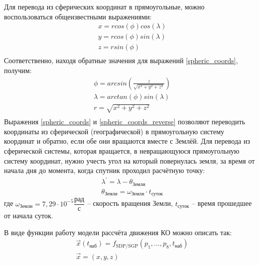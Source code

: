 Для перевода из сферических координат в прямоугольные, можно воспользоваться общеизвестными выражениями:
\begin{equation}  \label{spheric_coords}
	\begin{aligned} 
		& x = r cos(\phi)cos(\lambda) \\ 
		& y = r cos(\phi)sin(\lambda) \\ 
		& z = r sin(\phi) \\ 
	\end{aligned} 
\end{equation} 
Соответственно, находя обратные значения для выражений \ref{spheric_coords}, получим:
\begin{equation} \label{spheric_coords_reverse}
	\begin{aligned}
		& \phi = arcsin(\frac{z}{\sqrt{x^2+y^2+z^2}}) \\ 
		& \lambda = arctan(\phi)sin(\lambda) \\ 
		& r = \sqrt{x^2+y^2+z^2} \\ 
	\end{aligned} 
\end{equation} 
Выражения \ref{spheric_coords} и \ref{spheric_coords_reverse} позволяют переводить координаты из сферической
(географической) в прямоугольную систему координат и обратно, если обе они вращаются вместе с Землёй. Для перевода
из сферической системы, которая вращается, в невращающуюся прямоугольную систему координат, нужно учесть угол на
который повернулась земля, за время от начала дня до момента, когда спутник проходил расчётную точку:
\begin{equation} 
	\begin{aligned} 
		& \lambda^{\prime} = \lambda - \theta_{\text{Земли}} \\ 
		& \theta_{\text{Земли}} = \omega_{\text{Земли}} \cdot t_{\text{суток}} 
	\end{aligned} 
\end{equation}
где $\omega_{\text{Земли}} = 7,29 \cdot 10^{-5} \dfrac{\text{рад}}{\text{с}}$ -- скорость вращения Земли, 
$t_{\text{суток}}$ -- время прошедшее от начала суток.

В виде функции работу модели рассчёта движения КО можно описать так:
\begin{equation}
	\begin{aligned}
		& \vec{x}(t_{\text{наб}}) = f_{\text{SDP/SGP}}(p_1,...,p_8, t_{\text{наб}}) \\
		& \vec{x} = (x, y, z)
	\end{aligned}
\end{equation}

